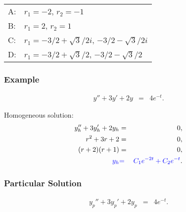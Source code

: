 {\begin{frame}
{        \vfill

        \begin{tabular}{ll}
          A: & $r_1=-2$, $r_2=-1$ \\ [12pt]
          B: & $r_1=2$, $r_2=1$ \\ [12pt]
          C: & $r_1 = -3/2+\sqrt{3}/2 i$, $-3/2-\sqrt{3}/2i$ \\ [12pt]
          D: & $r_1 = -3/2+\sqrt{3}/2$, $-3/2-\sqrt{3}/2$ \\
        \end{tabular}

        \vfill

    }\fi


\end{frame}
}


\begin{frame}
  \frametitle{Example}

  \begin{eqnarray*}
    y'' + 3y' + 2y & = & 4 e^{-t}.
  \end{eqnarray*}

  {
    Homogeneous solution:
    \begin{eqnarray*}
      y_h'' + 3y_h' + 2y_h & = & 0, \\
      r^2 + 3r + 2 & = & 0, \\
      (r+2)(r+1) & = & 0, \\
      {\color{blue}y_h} & {\color{blue}=} & {\color{blue}C_1 e^{-2t} + C_2 e^{-t}}.
    \end{eqnarray*}
  }

\end{frame}

\begin{frame}
  \frametitle{Particular Solution}


  \begin{eqnarray*}
    y_p'' + 3y_p' + 2y_p & = & 4 e^{-t}.
  \end{eqnarray*}



\end{frame}

